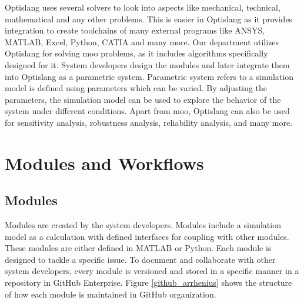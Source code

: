 Optislang uses several solvers to look into aspects like mechanical, technical, mathematical and any other problems. This is easier in Optislang as it provides
integration to create toolchains of many external programs like ANSYS, MATLAB, Excel, Python, CATIA and many more. Our department utilizes Optislang for solving 
\acrshort{moo} problems, as it includes algorithms specifically designed for it. System developers design the modules and later integrate them into Optislang 
as a parametric system. Parametric system refers to a simulation model is defined using parameters which can be varied. By adjusting the parameters, the 
simulation model can be used to explore the behavior of the system under different conditions. Apart from \acrshort{moo}, Optislang can also be used for 
sensitivity analysis, robustness analysis, reliability analysis, and many more. 
\section{Modules and Workflows}
\subsection{Modules}
Modules are created by the system developers. Modules include a simulation model as a calculation with defined interfaces for coupling with other modules. 
These modules are either defined in MATLAB or Python. Each module is designed to tackle a specific issue. To document and collaborate with other
system developers, every module is versioned and stored in a specific manner in a repository in GitHub Enterprise. Figure \ref{github_arrhenius} shows the 
structure of how each module is maintained in GitHub organization.

